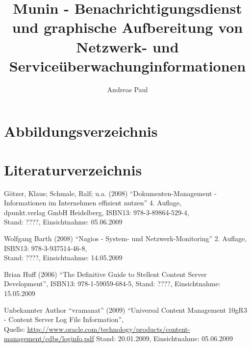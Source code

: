 \documentclass[12pt, a4paper, headsepline]{article}
\author{Andreas Paul}
\title{Munin - Benachrichtigungsdienst und graphische Aufbereitung von Netzwerk- und Serviceüberwachunginformationen}
\renewcommand{\refname}{Quellenverzeichnis}
\begin{document}
\setlength{\parindent}{0mm}

\thispagestyle{empty}
\newpage 
\renewcommand{\contentsname}{Inhalt}
\tableofcontents
\newpage

\newpage
 
\newpage
 \newpage
 \newpage
 \newpage
% 


\section{Abbildungsverzeichnis}
\listoffigures

\newpage
\renewcommand{\refname}{} 
\section{Literaturverzeichnis}
\begin{thebibliography}{xxxxxxxx}
	 Götzer, Klaus; Schmale, Ralf; u.a. (2008) "`Dokumenten-Management - Informationen im Internehmen effizient nutzen"' 4. Auflage,\\
	 dpunkt.verlag GmbH Heidelberg,  
	 ISBN13: 978-3-89864-529-4,\\
	 Stand: ????, Einsichtnahme: 05.06.2009

	 Wolfgang Barth (2008) "`Nagios - System- und Netzwerk-Monitoring"' 2. Auflage, \\
	 ISBN13: 978-3-937514-46-8, \\
	 Stand: ????, Einsichtnahme: 14.05.2009
	 
	 Brian Huff (2006) "`The Definitive Guide to Stellent Content Server Development"', \newline ISBN13: 978-1-59059-684-5, \newline Stand: ????, Einsichtnahme: 15.05.2009
	 
	 	  Unbekannter Author "`vramanat"' (2009) "`Universal Content Management 10gR3 - Content Server Log File Information"', \\ Quelle: \url{http://www.oracle.com/technology/products/content-management/cdbs/loginfo.pdf} \newline Stand: 20.01.2009, Einsichtnahme: 05.06.2009
\end{thebibliography}\newpage
\makeindex
\makeglossary
\printglossary
\end{document}
